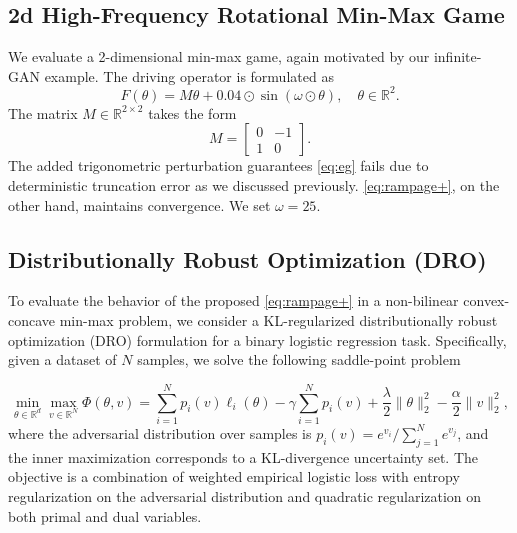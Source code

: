 \documentclass[letter,11pt]{article}
\begin{document}
\subsection{2d High-Frequency Rotational Min-Max Game}\label{sec:exp-3}
We evaluate a 2-dimensional min-max game, again motivated by our infinite-GAN example. The driving operator is formulated as
\begin{equation}
F(\theta) = M\theta + 0.04 \odot \sin(\omega \odot \theta), \quad\theta \in \mathbb{R}^{2}.
\end{equation}
The matrix $M \in \mathbb{R}^{2 \times 2}$ takes the form
\begin{equation}
M = \begin{bmatrix} 0 & -1 \\ 1 & 0 \end{bmatrix}.
\end{equation}
The added trigonometric perturbation guarantees \eqref{eq:eg} fails due to deterministic truncation error as we discussed previously. \eqref{eq:rampage+}, on the other hand, maintains convergence. We set $\omega =25$.

\subsection{Distributionally Robust Optimization (DRO)}\label{sec:exp-4}
To evaluate the behavior of the proposed \eqref{eq:rampage+} in a non-bilinear convex-concave min-max problem, we consider a KL-regularized distributionally robust optimization (DRO) formulation for a binary logistic regression task. Specifically, given a dataset of $N$ samples, we solve the following saddle-point problem 

\begin{equation}
    \min_{\theta\in \mathbb{R}^d}\max_{v\in \mathbb{R}^N} \Phi(\theta, v) = \sum_{i=1}^Np_i(v)\ell_i(\theta) - \gamma \sum_{i=1}^Np_i(v) + \frac{\lambda}{2}\|\theta\|_2^2 - \frac{\alpha}{2}\|v\|_2^2,
\end{equation}where the adversarial distribution over samples is $p_i(v) = e^{v_i}/\sum_{j=1}^Ne^{v_j}$, and the inner maximization corresponds to a KL-divergence uncertainty set. The objective is a combination of weighted empirical logistic loss with entropy regularization on the adversarial distribution and quadratic regularization on both primal and dual variables. 
\end{document}
